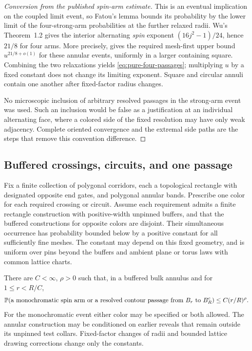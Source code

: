 \begin{proof}[Conversion from the published spin-arm estimate]
This is an eventual implication on the coupled limit event, so
Fatou's lemma bounds its probability by the lower limit of the
four-strong-arm probabilities at the further relaxed radii. Wu's
Theorem~1.2 gives the interior alternating \emph{spin} exponent
\((16j^2-1)/24\), hence \(21/8\) for four arms. More precisely,
\cite[Equation~(5.4) and Corollary~5.4]{Wu2018} gives the required mesh-first upper
bound \(u^{21/8+o(1)}\) for these annular events, uniformly in a
larger containing square. Combining the two relaxations yields
\eqref{eq:pure-four-passages}; multiplying \(u\) by a fixed constant
does not change its limiting exponent. Square and circular annuli
contain one another after fixed-factor radius changes.

No microscopic inclusion of arbitrary resolved passages in the
strong-arm event was used. Such an inclusion would be false as a
justification at an individual alternating face, where a colored side
of the fixed resolution may have only weak adjacency. Complete
oriented convergence and the extremal side paths are the steps that
remove this convention difference.
\end{proof}

\subsection{Buffered crossings, circuits, and one passage}

\begin{proposition}
\label{prop:pure-rsw}
Fix a finite collection of polygonal corridors, each a topological
rectangle with designated opposite end gates, and polygonal annular
bands. Prescribe one color for each required crossing or circuit.
Assume each requirement admits a finite rectangle construction with
positive-width unpinned buffers, and that the buffered constructions
for opposite colors are disjoint. Their simultaneous occurrence has
probability bounded below by a positive constant for all sufficiently
fine meshes. The constant may depend on this fixed geometry, and is
uniform over pins beyond the buffers and ambient plane or torus laws
with common lattice charts.

There are \(C<\infty\), \(\rho>0\) such that, in a buffered bulk
annulus and for \(1\le r<R/C\),
\begin{equation}
 \P(\text{a monochromatic spin arm or a resolved contour passage
                 from }B_r\text{ to }B_R^c)
 \le C(r/R)^\rho.
 \label{eq:pure-one-passage}
\end{equation}
For the monochromatic event either color may be specified or both
allowed. The annular construction may be conditioned on earlier
reveals that remain outside its unpinned test collars. Fixed-factor
changes of radii and bounded lattice drawing corrections change only
the constants.
\end{proposition}

